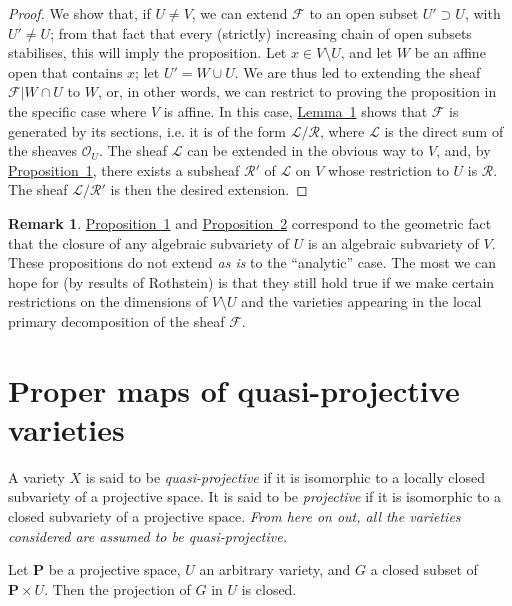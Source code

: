 \documentclass{article}
\theoremstyle{plain}
\newenvironment{lemma}[1]
    {\renewcommand\theinnerlemma{#1}\innerlemma}
    {\endinnerlemma}
\theoremstyle{definition}
\newtheorem*{remark}{Remark}
\newcommand{\scr}[1]{{\mathscr{#1}}}
\newcommand{\PP}{\mathbf{P}}
\begin{document}
\begin{proof}
  We show that, if $U\neq V$, we can extend $\scr{F}$ to an open subset $U'\supset U$, with $U'\neq U$;
  from that fact that every (strictly) increasing chain of open subsets stabilises, this will imply the proposition.
  Let $x\in V\setminus U$, and let $W$ be an affine open that contains $x$;
  let $U'=W\cup U$.
  We are thus led to extending the sheaf $\scr{F}|W\cap U$ to $W$, or, in other words, we can restrict to proving the proposition in the specific case where $V$ is affine.
  In this case, \hyperref[lemma1]{Lemma~1} shows that $\scr{F}$ is generated by its sections, i.e. it is of the form $\scr{L}/\scr{R}$, where $\scr{L}$ is the direct sum of the sheaves $\scr{O}_U$.
  The sheaf $\scr{L}$ can be extended in the obvious way to $V$, and, by \hyperref[proposition1]{Proposition~1}, there exists a subsheaf $\scr{R}'$ of $\scr{L}$ on $V$ whose restriction to $U$ is $\scr{R}$.
  The sheaf $\scr{L}/\scr{R}'$ is then the desired extension.
\end{proof}

\begin{remark}
  \hyperref[proposition1]{Proposition~1} and \hyperref[proposition2]{Proposition~2} correspond to the geometric fact that the closure of any algebraic subvariety of $U$ is an algebraic subvariety of $V$.
  These propositions do not extend \emph{as is} to the ``analytic'' case.
  The most we can hope for (by results of Rothstein) is that they still hold true if we make certain restrictions on the dimensions of $V\setminus U$ and the varieties appearing in the local primary decomposition of the sheaf $\scr{F}$.
\end{remark}


\section{Proper maps of quasi-projective varieties}
\label{section2}

A variety $X$ is said to be \emph{quasi-projective} if it is isomorphic to a locally closed subvariety of a projective space.
It is said to be \emph{projective} if it is isomorphic to a closed subvariety of a projective space.
\emph{From here on out, all the varieties considered are assumed to be quasi-projective.}

\begin{lemma}{3}
\label{lemma3}
  Let $\PP$ be a projective space, $U$ an arbitrary variety, and $G$ a closed subset of $\PP\times U$.
  Then the projection of $G$ in $U$ is closed.
\end{lemma}
\end{document}
